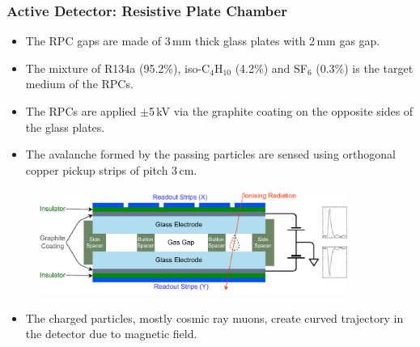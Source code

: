 \documentclass{beamer}
\begin{document}
\begin{frame}
  \frametitle{Active Detector: Resistive Plate Chamber}
  \vspace*{-7pt}
  \begin{itemize} \itemsep -1pt
  \item The RPC gaps are made of 3\,mm thick glass plates with 2\,mm
    gas gap.
  \item The mixture of R134a (95.2\%), iso-C$_4$H$_{10}$ (4.2\%)
    and SF$_6$ (0.3\%) is the target medium of the RPCs.
  \item The RPCs are applied $\pm$5\,kV via the graphite coating on the
    opposite sides of the glass plates.
  \item The avalanche formed by the passing particles are sensed
    using orthogonal copper pickup strips of pitch 3\,cm.
  \end{itemize}
  \vspace*{-8pt}
  \begin{figure}[h!]
    \includegraphics[width=0.9\textwidth]{basic_rpc.pdf}
  \end{figure}
  \vspace*{-12pt}
  \begin{itemize} %
  \item The charged particles, mostly cosmic ray muons, create curved
    trajectory in the detector due to magnetic field.
  \end{itemize}
\end{frame}
\end{document}
